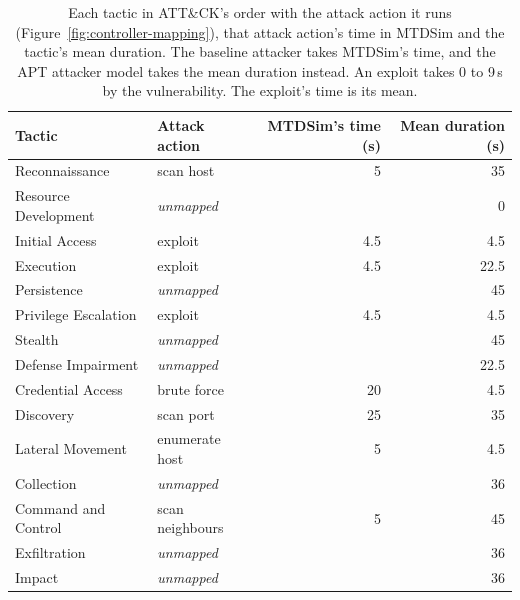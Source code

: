 
\begin{table}[htbp]
\centering
\caption[The baseline attacker's times and the tactic durations]{Each tactic in ATT\&CK's order with the attack action it runs (Figure~\ref{fig:controller-mapping}), that attack action's time in MTDSim \citep{tay2024code} and the tactic's mean duration. The baseline attacker takes MTDSim's time, and the APT attacker model takes the mean duration instead. An exploit takes 0 to 9\,s by the vulnerability. The exploit's time is its mean.}
\label{tab:attack-action-times}
\tablestyle
\begin{tabular}{@{}l l r r@{}}
\toprule
Tactic & Attack action & MTDSim's time (s) & Mean duration (s) \\
\midrule
Reconnaissance & scan host & 5 & 35 \\
Resource Development & \emph{unmapped} &  & 0 \\
Initial Access & exploit & 4.5 & 4.5 \\
Execution & exploit & 4.5 & 22.5 \\
Persistence & \emph{unmapped} &  & 45 \\
Privilege Escalation & exploit & 4.5 & 4.5 \\
Stealth & \emph{unmapped} &  & 45 \\
Defense Impairment & \emph{unmapped} &  & 22.5 \\
Credential Access & brute force & 20 & 4.5 \\
Discovery & scan port & 25 & 35 \\
Lateral Movement & enumerate host & 5 & 4.5 \\
Collection & \emph{unmapped} &  & 36 \\
Command and Control & scan neighbours & 5 & 45 \\
Exfiltration & \emph{unmapped} &  & 36 \\
Impact & \emph{unmapped} &  & 36 \\
\bottomrule
\end{tabular}
\end{table}
